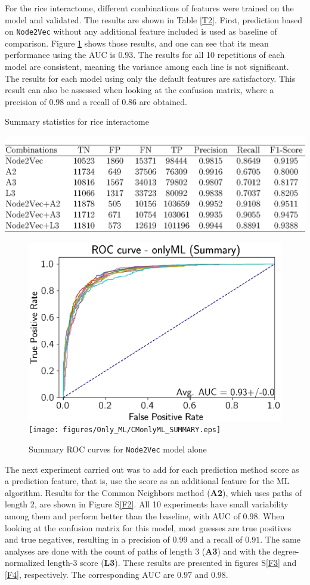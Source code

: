 For the rice interactome, different combinations of features were
trained on the model and validated. The results are shown in Table
\ref{T2}. First, prediction based on \texttt{Node2Vec} without any
additional feature included is used as baseline of comparison. Figure
\ref{F1} shows those results, and one can see that its mean performance
using the AUC is $0.93$. The results for all 10 repetitions of each
model are consistent, meaning the variance among each line is not
significant. The results for each model using only the default features
are satisfactory. This result can also be assessed when looking at
the confusion matrix, where a precision of $0.98$ and a recall of
$0.86$ are obtained.

\begin{table}
\caption{\label{T2}Summary statistics for rice interactome}
\includegraphics[width=1\columnwidth]{figures/T2.eps}
\end{table}

\begin{figure}[h]
\noindent \begin{centering}
\caption{\label{F1}Summary ROC curves for \texttt{Node2Vec} model alone}
\par\end{centering}
\noindent \raggedleft{}\includegraphics[width=0.48\columnwidth]{figures/Only_ML/ROConlyML_SUMMARY.eps}\texttt{[image: figures/Only\_ML/CMonlyML\_SUMMARY.eps]}
\end{figure}

The next experiment carried out was to add for each prediction method
score as a prediction feature, that is, use the score as an additional
feature for the ML algorithm. Results for the Common Neighbors method
(\textbf{A2}), which uses paths of length 2, are shown in Figure S\ref{F2}.
All 10 experiments have small variability among them and perform better
than the baseline, with AUC of $0.98$. When looking at the confusion
matrix for this model, most guesses are true positives and true negatives,
resulting in a precision of $0.99$ and a recall of $0.91$. The same
analyses are done with the count of paths of length 3 (\textbf{A3})
and with the degree-normalized length-3 score (\textbf{L3}). These
results are presented in figures S\ref{F3} and \ref{F4}, respectively.
The corresponding AUC are $0.97$ and $0.98$.

